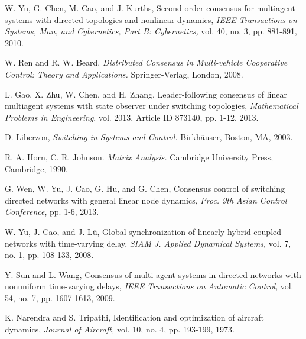\documentclass[letterpaper, 10 pt, conference]{ieeeconf}
\begin{document}
\begin{thebibliography}{99}
W. Yu, G. Chen, M. Cao, and J. Kurths,
Second-order consensus for multiagent systems with directed topologies and nonlinear dynamics,
\emph{IEEE Transactions on Systems, Man, and Cybernetics, Part B: Cybernetics,}
vol. 40, no. 3, pp. 881-891, 2010.

W. Ren and R. W. Beard.
\emph{Distributed Consensus in
Multi-vehicle Cooperative Control: Theory and Applications.}
Springer-Verlag, London, 2008.


L. Gao, X. Zhu, W. Chen, and H. Zhang,
Leader-following consensus of linear multiagent systems with state observer under switching topologies,
\emph{Mathematical Problems in Engineering}, vol. 2013, Article ID 873140, pp. 1-12, 2013.

D. Liberzon,
\emph{Switching in Systems and Control.}
Birkh\"{a}user, Boston, MA, 2003.

R. A. Horn, C. R. Johnson. \emph{Matrix Analysis.} Cambridge University Press, Cambridge, 1990.

G. Wen, W. Yu, J. Cao,  G. Hu, and G. Chen,
Consensus control of switching directed networks with general linear node dynamics,
\emph{Proc. 9th Asian Control Conference}, pp. 1-6, 2013.

W. Yu, J. Cao, and J. L\"{u},
Global synchronization of linearly hybrid coupled networks with time-varying
delay,
\emph{SIAM J. Applied Dynamical Systems,} vol. 7, no. 1, pp. 108-133, 2008.

Y. Sun and L. Wang,
Consensus of multi-agent systems in directed networks
with nonuniform time-varying delays,
\emph{IEEE Transactions on Automatic Control}, vol. 54, no. 7, pp. 1607-1613, 2009.


K. Narendra and S. Tripathi, Identification and optimization of aircraft dynamics,
\emph{Journal of Aircraft,}
vol. 10, no. 4, pp. 193-199, 1973.



\end{thebibliography}
\end{document}
